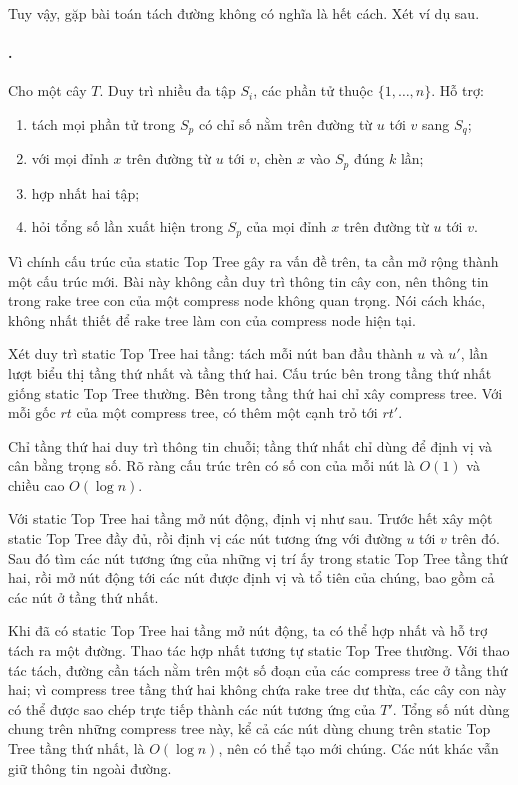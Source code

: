 \documentclass[11pt]{article}
\begin{document}
Tuy vậy, gặp bài toán tách đường không có nghĩa là hết cách. Xét ví dụ sau.

\paragraph{.}
Cho một cây \(T\). Duy trì nhiều đa tập \(S_i\), các phần tử thuộc
\(\{1,\ldots,n\}\). Hỗ trợ:
\begin{enumerate}
  \item tách mọi phần tử trong \(S_p\) có chỉ số nằm trên đường từ \(u\) tới
  \(v\) sang \(S_q\);
  \item với mọi đỉnh \(x\) trên đường từ \(u\) tới \(v\), chèn \(x\) vào
  \(S_p\) đúng \(k\) lần;
  \item hợp nhất hai tập;
  \item hỏi tổng số lần xuất hiện trong \(S_p\) của mọi đỉnh \(x\) trên đường
  từ \(u\) tới \(v\).
\end{enumerate}

Vì chính cấu trúc của static Top Tree gây ra vấn đề trên, ta cần mở rộng thành
một cấu trúc mới. Bài này không cần duy trì thông tin cây con, nên thông tin
trong rake tree con của một compress node không quan trọng. Nói cách khác,
không nhất thiết để rake tree làm con của compress node hiện tại.

Xét duy trì static Top Tree hai tầng: tách mỗi nút ban đầu thành \(u\) và
\(u'\), lần lượt biểu thị tầng thứ nhất và tầng thứ hai. Cấu trúc bên trong
tầng thứ nhất giống static Top Tree thường. Bên trong tầng thứ hai chỉ xây
compress tree. Với mỗi gốc \(rt\) của một compress tree, có thêm một cạnh trỏ
tới \(rt'\).

Chỉ tầng thứ hai duy trì thông tin chuỗi; tầng thứ nhất chỉ dùng để định vị và
cân bằng trọng số. Rõ ràng cấu trúc trên có số con của mỗi nút là \(O(1)\) và
chiều cao \(O(\log n)\).

Với static Top Tree hai tầng mở nút động, định vị như sau. Trước hết xây một
static Top Tree đầy đủ, rồi định vị các nút tương ứng với đường \(u\) tới \(v\)
trên đó. Sau đó tìm các nút tương ứng của những vị trí ấy trong static Top Tree
tầng thứ hai, rồi mở nút động tới các nút được định vị và tổ tiên của chúng,
bao gồm cả các nút ở tầng thứ nhất.

Khi đã có static Top Tree hai tầng mở nút động, ta có thể hợp nhất và hỗ trợ
tách ra một đường. Thao tác hợp nhất tương tự static Top Tree thường. Với thao
tác tách, đường cần tách nằm trên một số đoạn của các compress tree ở tầng thứ
hai; vì compress tree tầng thứ hai không chứa rake tree dư thừa, các cây con
này có thể được sao chép trực tiếp thành các nút tương ứng của \(T'\). Tổng số
nút dùng chung trên những compress tree này, kể cả các nút dùng chung trên
static Top Tree tầng thứ nhất, là \(O(\log n)\), nên có thể tạo mới chúng. Các
nút khác vẫn giữ thông tin ngoài đường.
\end{document}
